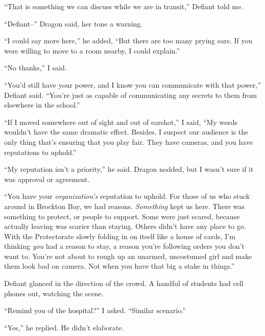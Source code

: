``That is something we can discuss while we are in transit,'' Defiant told me.



``Defiant--'' Dragon said, her tone a warning.



``I could say more here,'' he added, ``But there are too many prying ears.  If you were willing to move to a room nearby, I could explain.''



``No thanks,'' I said.



``You'd still have your power, and I know you can communicate with that power,'' Defiant said.  ``You're just as capable of communicating any secrets to them from elsewhere in the school.''



``If I moved somewhere out of sight and out of earshot,'' I said, ``My words wouldn't have the same dramatic effect.  Besides, I suspect our audience is the only thing that's ensuring that you play fair.  They have cameras, and you have reputations to uphold.''



``My reputation isn't a priority,'' he said.  Dragon nodded, but I wasn't sure if it was approval or agreement.



``You have your \emph{organization's} reputation to uphold.  For those of us who stuck around in Brockton Bay, we had reasons.  \emph{Something }kept us here.  There was something to protect, or people to support.  Some were just scared, because actually leaving was scarier than staying.  Others didn't have any place to go.  With the Protectorate slowly folding in on itself like a house of cards, I'm thinking \emph{you} had a reason to stay, a reason you're following orders you don't want to.  You're not about to rough up an unarmed, uncostumed girl and make them look bad on camera.  Not when you have that big a stake in things.''



Defiant glanced in the direction of the crowd.  A handful of students had cell phones out, watching the scene.



``Remind you of the hospital?'' I asked.  ``Similar scenario.''



``Yes,'' he replied.  He didn't elaborate.



